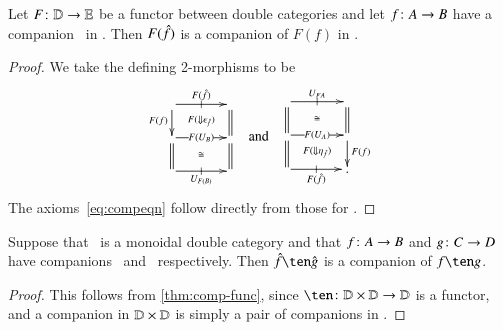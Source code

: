\documentclass{amsart}
\begin{document}
\begin{lem}\label{thm:comp-func}
  Let $F\colon \mathbb{D}\to\mathbb{E}$ be a functor between double categories and
  let $f\colon A\to B$ have a companion \fhat\ in \lD.  Then $F(\hat{f})$
  is a companion of $F(f)$ in \lE.
\end{lem}
\begin{proof}
  We take the defining 2-morphisms to be
  \[\vcenter{\xymatrix@R=1.5pc@C=3pc{
      \ar[r]|-@{|}^-{F(\fhat)} \ar[d]_{F(f)}
      \ar@{}[dr]|{F(\Downarrow \epsilon_{\hat{f}})} &  \ar@{=}[d]\\
      \ar[r]|-{F(U_B)} \ar@{=}[d] \ar@{}[dr]|\iso &  \ar@{=}[d]\\
      \ar[r]|-@{|}_-{U_{F(B)}} & }}
  \quad\text{and}\quad
  \vcenter{\xymatrix@R=1.5pc@C=3pc{
      \ar[r]|-@{|}^-{U_{FA}} \ar@{=}[d] \ar@{}[dr]|\iso & \ar@{=}[d]\\
      \ar[r]|-{F(U_{A})} \ar@{=}[d] \ar@{}[dr]|{F(\Downarrow \eta_{\hat{f}})} & 
      \ar[d]^{F(f)}\\
      \ar[r]|-@{|}_-{F(\fhat)} & .}}\]
  The axioms~\eqref{eq:compeqn} follow directly from those for \fhat.
\end{proof}

\begin{lem}\label{thm:comp-ten}
  Suppose that \lD\ is a monoidal double category and that $f\colon
  A\to B$ and $g\colon C\to D$ have companions \fhat\ and \ghat\
  respectively.  Then $\fhat\ten\ghat$ is a companion of $f\ten g$.
\end{lem}
\begin{proof}
  This follows from \autoref{thm:comp-func}, since $\ten\maps
  \lD\times\lD\to\lD$ is a functor, and a companion in $\mathbb{D}\times\mathbb{D}$
  is simply a pair of companions in \lD.
\end{proof}
\end{document}
